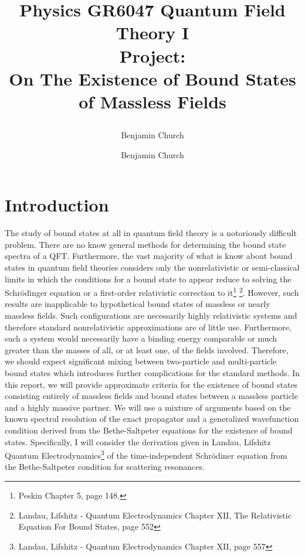 \documentclass[12pt]{article}
\author{Benjamin Church }
\begin{document}
\newcommand{\MeV}{\: \mathrm{MeV}}
\newcommand{\GeV}{\: \mathrm{GeV}}

\title{%
	\large \textbf{Physics GR6047 Quantum Field Theory I
	\\
	Project:
	\\ On The Existence of Bound States of Massless Fields \vspace{-2ex}}
\author{Benjamin Church }
}
\maketitle

\section{Introduction}
The study of bound states at all in quantum field theory is a notoriously difficult problem. There are no know general methods for determining the bound state spectra of a QFT. Furthermore, the vast majority of what is know about bound states in quantum field theories considers only the nonrelativistic or semi-classical limits in which the conditions for a bound state to appear reduce to solving the Schr\"{o}dinger equation or a first-order relativistic correction to it\footnote{Peskin Chapter 5, page 148.} \footnote{ Landau, Lifshitz - Quantum Electrodynamics Chapter XII, The Relativistic Equation For Bound States, page 552}. However, such results are inapplicable to hypothetical bound states of massless or nearly massless fields. Such configurations are necessarily highly relativistic systems and therefore standard nonrelativistic approximations are of little use. Furthermore, such a system would necessarily have a binding energy comparable or much greater than the masses of all, or at least one, of the fields involved. Therefore, we should expect significant mixing between two-particle and multi-particle bound states which introduces further complications for the standard methods. In this report, we will provide approximate criteria for the existence of bound states consisting entirely of massless fields and bound states between a massless particle and a highly massive partner. We will use a mixture of arguments based on the known spectral resolution of the exact propagator and a generalized wavefunction condition derived from the Bethe-Saltpeter equations for the existence of bound states. Specifically, I will consider the derivation given in Landau, Lifshitz Quantum Electrodynamics\footnote{ Landau, Lifshitz - Quantum Electrodynamics Chapter XII, page 557} of the time-independent Schr\"{o}diner equation from the Bethe-Saltpeter condition for scattering resonances.      
\end{document}
